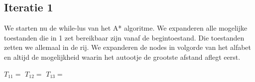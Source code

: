 \documentclass[alternative-exam.tex]{subfiles}
\begin{document}
\subsection{Iteratie 1}
We starten nu de while-lus van het A* algoritme. We expanderen alle mogelijke toestanden die in 1 zet bereikbaar zijn vanaf de begintoestand. Die toestanden zetten we allemaal in de rij. We expanderen de nodes in volgorde van het alfabet en altijd de mogelijkheid waarin het autootje de grootste afstand aflegt eerst.

\begin{center}
$T_{11} = $
$T_{12} = $
$T_{13} = $
\end{center}
\end{document}
